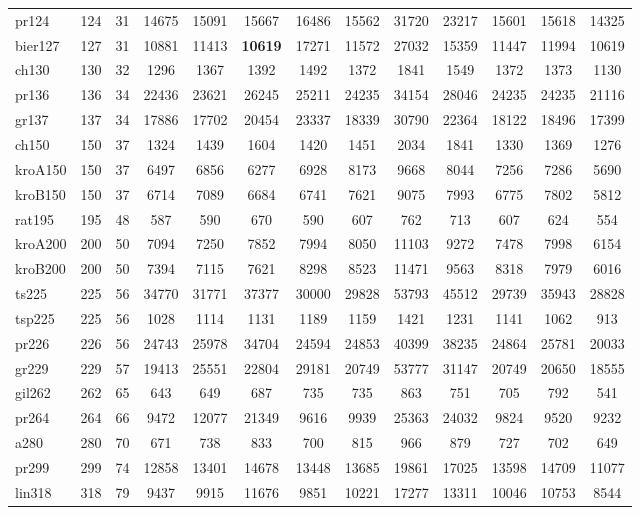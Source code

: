 \documentclass[conference]{IEEEtran}
\begin{document}
\begin{table}[htbp]
{{\begin{tabular}{|l|c|c|c|c|c|c|c|c|c|c|c|c|}
pr124 & 124 & 31 & 14675 & 15091 & 15667 & 16486 & 15562 & 31720 & 23217 & 15601 & 15618 & 14325 \\
bier127 & 127 & 31 & 10881 & 11413 & \textbf{10619} & 17271 & 11572 & 27032 & 15359 & 11447 & 11994 & 10619 \\
ch130 & 130 & 32 & 1296 & 1367 & 1392 & 1492 & 1372 & 1841 & 1549 & 1372 & 1373 & 1130 \\
pr136 & 136 & 34 & 22436 & 23621 & 26245 & 25211 & 24235 & 34154 & 28046 & 24235 & 24235 & 21116 \\
gr137 & 137 & 34 & 17886 & 17702 & 20454 & 23337 & 18339 & 30790 & 22364 & 18122 & 18496 & 17399 \\
ch150 & 150 & 37 & 1324 & 1439 & 1604 & 1420 & 1451 & 2034 & 1841 & 1330 & 1369 & 1276 \\
kroA150 & 150 & 37 & 6497 & 6856 & 6277 & 6928 & 8173 & 9668 & 8044 & 7256 & 7286 & 5690 \\
kroB150 & 150 & 37 & 6714 & 7089 & 6684 & 6741 & 7621 & 9075 & 7993 & 6775 & 7802 & 5812 \\
rat195 & 195 & 48 & 587 & 590 & 670 & 590 & 607 & 762 & 713 & 607 & 624 & 554 \\
kroA200 & 200 & 50 & 7094 & 7250 & 7852 & 7994 & 8050 & 11103 & 9272 & 7478 & 7998 & 6154 \\
kroB200 & 200 & 50 & 7394 & 7115 & 7621 & 8298 & 8523 & 11471 & 9563 & 8318 & 7979 & 6016 \\
ts225 & 225 & 56 & 34770 & 31771 & 37377 & 30000 & 29828 & 53793 & 45512 & 29739 & 35943 & 28828 \\
tsp225 & 225 & 56 & 1028 & 1114 & 1131 & 1189 & 1159 & 1421 & 1231 & 1141 & 1062 & 913 \\
pr226 & 226 & 56 & 24743 & 25978 & 34704 & 24594 & 24853 & 40399 & 38235 & 24864 & 25781 & 20033 \\
gr229 & 229 & 57 & 19413 & 25551 & 22804 & 29181 & 20749 & 53777 & 31147 & 20749 & 20650 & 18555 \\
gil262 & 262 & 65 & 643 & 649 & 687 & 735 & 735 & 863 & 751 & 705 & 792 & 541 \\
pr264 & 264 & 66 & 9472 & 12077 & 21349 & 9616 & 9939 & 25363 & 24032 & 9824 & 9520 & 9232 \\
a280 & 280 & 70 & 671 & 738 & 833 & 700 & 815 & 966 & 879 & 727 & 702 & 649 \\
pr299 & 299 & 74 & 12858 & 13401 & 14678 & 13448 & 13685 & 19861 & 17025 & 13598 & 14709 & 11077 \\
lin318 & 318 & 79 & 9437 & 9915 & 11676 & 9851 & 10221 & 17277 & 13311 & 10046 & 10753 & 8544 \\

\end{tabular}}}
\end{table}
\end{document}
